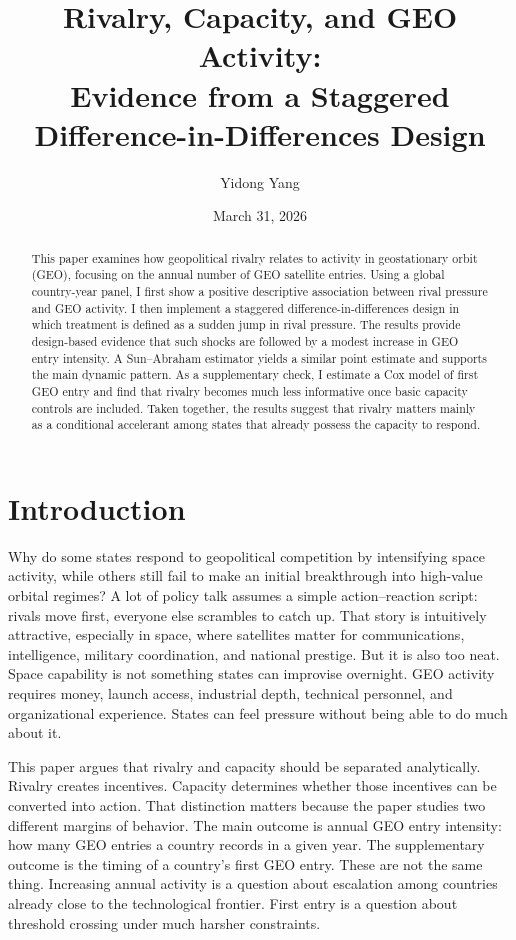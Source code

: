 \documentclass[11pt]{article}
\title{Rivalry, Capacity, and GEO Activity: \\ Evidence from a Staggered Difference-in-Differences Design}
\author{Yidong Yang}
\date{March 31, 2026}
\begin{document}
\maketitle

\begin{abstract}
This paper examines how geopolitical rivalry relates to activity in geostationary orbit (GEO), focusing on the annual number of GEO satellite entries. Using a global country-year panel, I first show a positive descriptive association between rival pressure and GEO activity. I then implement a staggered difference-in-differences design in which treatment is defined as a sudden jump in rival pressure. The results provide design-based evidence that such shocks are followed by a modest increase in GEO entry intensity. A Sun--Abraham estimator yields a similar point estimate and supports the main dynamic pattern. As a supplementary check, I estimate a Cox model of first GEO entry and find that rivalry becomes much less informative once basic capacity controls are included. Taken together, the results suggest that rivalry matters mainly as a conditional accelerant among states that already possess the capacity to respond.
\end{abstract}

\section{Introduction}
Why do some states respond to geopolitical competition by intensifying space activity, while others still fail to make an initial breakthrough into high-value orbital regimes? A lot of policy talk assumes a simple action--reaction script: rivals move first, everyone else scrambles to catch up. That story is intuitively attractive, especially in space, where satellites matter for communications, intelligence, military coordination, and national prestige. But it is also too neat. Space capability is not something states can improvise overnight. GEO activity requires money, launch access, industrial depth, technical personnel, and organizational experience. States can feel pressure without being able to do much about it.

This paper argues that rivalry and capacity should be separated analytically. Rivalry creates incentives. Capacity determines whether those incentives can be converted into action. That distinction matters because the paper studies two different margins of behavior. The main outcome is annual GEO entry intensity: how many GEO entries a country records in a given year. The supplementary outcome is the timing of a country's first GEO entry. These are not the same thing. Increasing annual activity is a question about escalation among countries already close to the technological frontier. First entry is a question about threshold crossing under much harsher constraints.
\end{document}
